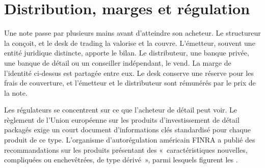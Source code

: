 \begin{omfigure}

\label{fig:dv:the-structured-products-business:payoffs}
\end{omfigure}

\section{Distribution, marges et régulation}

Une note passe par plusieurs mains avant d'atteindre son acheteur. Le structureur la conçoit, et le desk de trading la valorise et la couvre.
L'émetteur, souvent une entité juridique distincte, apporte le bilan. Le distributeur, une banque privée, une banque de détail ou un
conseiller indépendant, le vend. La marge de l'identité ci-dessus est partagée entre eux. Le desk conserve une réserve pour les frais de couverture, et
l'émetteur et le distributeur sont rémunérés par le prix de la note.

Les régulateurs se concentrent sur ce que l'acheteur de détail peut voir. Le règlement de l'Union européenne sur les produits d'investissement de détail packagés exige un
court document d'informations clés standardisé pour chaque produit de ce type. L'organisme d'autorégulation américain FINRA a publié des recommandations sur les produits
présentant des «~caractéristiques nouvelles, compliquées ou enchevêtrées, de type dérivé~», parmi lesquels figurent les .

